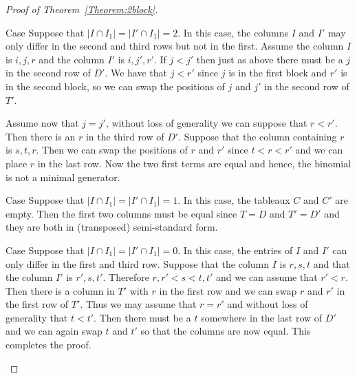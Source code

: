 \documentclass[ALCO,ThmDefs,Unicode,epreuves]{cedram}
\begin{document}
\begin{proof}[Proof of Theorem~\ref{Theorem:2block}]
\begin{enonce}[remark]{Case}\label{Case2}%
Suppose that $| I \cap I_1 | = |I' \cap I_1| =2$. In this case, the columns $I$ and $I'$ may only differ in the second and third rows but not in the first. Assume the column $I$ is $i, j, r$ and the column $I'$ is $i, j', r'$. If $j <j'$ then just as above there must be a $j$ in the second row of $D'$. We have that $j <r'$ since $j$ is in the first block and $r'$ is in the second block, so we can swap the positions of $j $ and $j'$ in the second row of $T'$. 

Assume now that $j = j'$, without loss of generality we can suppose that $r<r'$. Then there is an $r$ in the third row of $D'$. Suppose that the column containing $r$ is $s, t, r$. Then we can swap the positions of $r$ and $r'$ since $t<r<r'$ and we can place $r$ in the last row. Now the two first terms are equal and hence, the binomial is not a minimal generator.
\end{enonce}

\begin{enonce}[remark]{Case}\label{Case3}%
Suppose that $| I \cap I_1 | = |I' \cap I_1| = 1$. In this case, the tableaux $C$ and $C'$ are empty. Then the first two columns must be equal since $T = D$ and $T'= D'$ and they are both in (transposed) semi-standard form. 
\end{enonce}

\begin{enonce}[remark]{Case}\label{Case4}\setcounter{cdrthm}{4}
Suppose that $| I \cap I_1 | = |I' \cap I_1| =0$. In this case, the entries of $I$ and $I'$ can only differ in the first and third row. Suppose that the column $I$ is $r, s, t$ and that the column $I'$ is $r', s, t'$. 
Therefore $r, r'<s<t, t'$ and we can assume that $r' <r$. 
Then there is a column in $T'$ with $r$ in the first row and we can swap $r$ and $r'$ in the first row of $T'$. 
Thus we may assume that $r = r'$ and without loss of generality that $t < t'$. Then there must be a $t$ somewhere in the last row of $D'$ and we can again swap $t$ and $t'$ so that the columns are now equal. This completes the proof. \qedhere
\end{enonce}
\end{proof}
\end{document}

